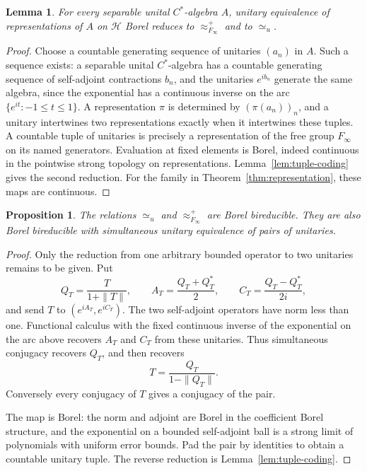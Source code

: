 \documentclass[11pt]{article}
\numberwithin{equation}{section}
\newtheorem{proposition}[theorem]{Proposition}
\newtheorem{lemma}[theorem]{Lemma}
\theoremstyle{definition}
\begin{document}
\begin{lemma}\label{lem:algebra-coding}
For every separable unital $C^*$-algebra $A$, unitary equivalence of
representations of $A$ on $\mathcal H$ Borel reduces to
$\approx^+_{F_\infty}$ and to ${\simeq_u}$.
\end{lemma}
\begin{proof}
Choose a countable generating sequence of unitaries $(a_n)$ in $A$.
Such a sequence exists: a separable unital $C^*$-algebra has a countable
generating sequence of self-adjoint contractions $b_n$, and the
unitaries $e^{ib_n}$ generate the same algebra, since the exponential
has a continuous inverse on the arc $\{e^{it}:-1\le t\le1\}$.
A representation $\pi$ is determined by $(\pi(a_n))_n$, and a unitary
intertwines two representations exactly when it intertwines these
tuples. A countable tuple of unitaries is precisely a representation
of the free group $F_\infty$ on its named generators.
Evaluation at fixed elements is Borel, indeed continuous in the
pointwise strong topology on representations. Lemma~\ref{lem:tuple-coding}
gives the second reduction. For the family in
Theorem~\ref{thm:representation}, these maps are continuous.
\end{proof}

\begin{proposition}\label{prop:operator-group}
The relations ${\simeq_u}$ and $\approx^+_{F_\infty}$ are
Borel bireducible. They are also Borel bireducible with simultaneous
unitary equivalence of pairs of unitaries.
\end{proposition}
\begin{proof}
Only the reduction from one arbitrary bounded operator to two
unitaries remains to be given. Put
\[
 Q_T=\frac{T}{1+\|T\|},\qquad
 A_T=\frac{Q_T+Q_T^*}{2},\qquad
 C_T=\frac{Q_T-Q_T^*}{2i},
\]
and send $T$ to $(e^{iA_T},e^{iC_T})$.
The two self-adjoint operators have norm less than one. Functional
calculus with the fixed continuous inverse of the exponential on the
arc above recovers $A_T$ and $C_T$ from these unitaries. Thus simultaneous
conjugacy recovers $Q_T$, and then recovers
\[
 T=\frac{Q_T}{1-\|Q_T\|}.
\]
Conversely every conjugacy of $T$ gives a conjugacy of the pair.

The map is Borel: the norm and adjoint are Borel in the coefficient
Borel structure, and the exponential on a bounded self-adjoint ball
is a strong limit of polynomials with uniform error bounds.
Pad the pair by identities to obtain a countable unitary tuple.
The reverse reduction is Lemma~\ref{lem:tuple-coding}.
\end{proof}
\end{document}
